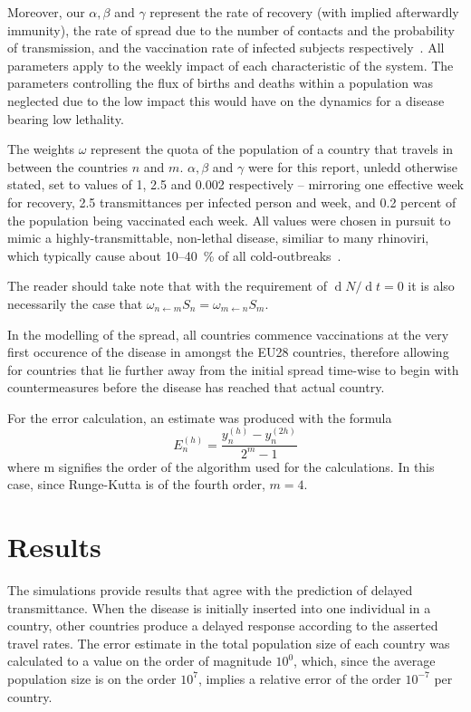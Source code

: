 \documentclass[a4paper,12pt]{article}
\renewcommand{\d}[1]{\ensuremath{\operatorname{d}\!{#1}}} %
\theoremstyle{plain}
\theoremstyle{definition}
\begin{document}
   Moreover, our $\alpha, \beta$ and $\gamma$ represent the rate of recovery (with
   implied afterwardly immunity), the rate of spread due to the number of
   contacts and the probability of transmission, and the vaccination rate of infected subjects
   respectively~\cite{lecnotes}. All parameters apply to the weekly impact of
   each characteristic of the system. The
   parameters controlling the flux of births and deaths within a
   population was neglected due to the low impact this would have on the
   dynamics for a disease bearing low lethality. 
   
   The weights $\omega$ represent the quota of the population of a country that
   travels in between the countries $n$ and $m$. $\alpha, \beta$ and $\gamma$
   were for this report, unledd otherwise stated, set to values of 1, 2.5 and 
   0.002 respectively -- mirroring one effective week for recovery, 2.5 
   transmittances per infected person and week, and 0.2 percent of the population 
   being vaccinated each week. All values were chosen in pursuit to mimic a
   highly-transmittable, non-lethal disease, similiar to many
   rhinoviri, which typically cause about 10--40~\% of all
   cold-outbreaks~\cite{rhino}. 
   
   The reader should take note
   that with the requirement of $\d N/\d t = 0$ it is also necessarily the case 
   that $\omega_{n\leftarrow m} S_n = \omega_{m \leftarrow n}S_m$. 

   In the modelling of the spread, all countries commence vaccinations at the
   very first occurence of the disease in amongst the EU28 countries, therefore
   allowing for countries that lie further away from the initial spread
   time-wise to begin with countermeasures before the disease has reached that
   actual country.

   For the error calculation, an estimate was produced with the formula
   \begin{equation}
      E_n^{(h)} = \frac{y_n^{(h)} - y_n^{(2h)}}{2^m -1}
      \label{eq:err}
   \end{equation}
   where m signifies the order of the algorithm used for the calculations. In
   this case, since Runge-Kutta is of the fourth order, $m=4$.
   
\section*{Results}
   The simulations provide results that agree with the prediction of delayed
   transmittance. When the disease is initially inserted into one individual in
   a country, other countries produce a delayed response according to the
   asserted travel rates. The error estimate in the total population size of
   each country was calculated to a value on the order of magnitude $10^{0}$, which, 
   since the average population size is on the order $10^{7}$, implies a 
   relative error of the order $10^{-7}$ per country.
   
\end{document}
